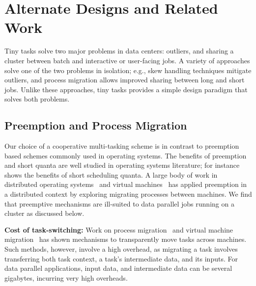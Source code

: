 \section{Alternate Designs and Related Work}

Tiny tasks solve two major problems in data centers: outliers, and sharing
a cluster between batch and interactive or user-facing jobs. A variety of
approaches solve one of the two problems in isolation; e.g., skew handling
techniques mitigate outliers, and process migration allows improved
sharing between long and short jobs.  Unlike these approaches, tiny tasks
provides a simple design paradigm that solves both problems.

\subsection{Preemption and Process Migration}
\label{sec:alternate}

Our choice of a cooperative multi-tasking scheme is in contrast to
preemption based schemes commonly used in operating systems. The benefits of
preemption and short quanta are well studied in operating
systems literature; for instance~\cite{sherman1972trace} shows the benefits
of short scheduling quanta. A large body of work in distributed
operating systems~\cite{douglis1991transparent,milojivcic2000process,rozier1991overview} and virtual machines~\cite{tanenbaum1990experiences}
has applied preemption in a distributed context by exploring migrating
processes between machines.
We find that preemptive mechanisms are
ill-suited to data parallel jobs running on a cluster as discussed below.

\vspace{4pt}\noindent\textbf{Cost of task-switching:}
Work on process
migration~\cite{douglis1991transparent,milojivcic2000process} and virtual
machine migration~\cite{clark2005live} has shown mechanisms to transparently
move tasks across machines. Such methods, however, involve a high overhead, as
migrating a task involves transferring both task context, a task's intermediate
data, and its inputs. For data parallel applications, input data, and intermediate
data can be several gigabytes, incurring very high overheads.

